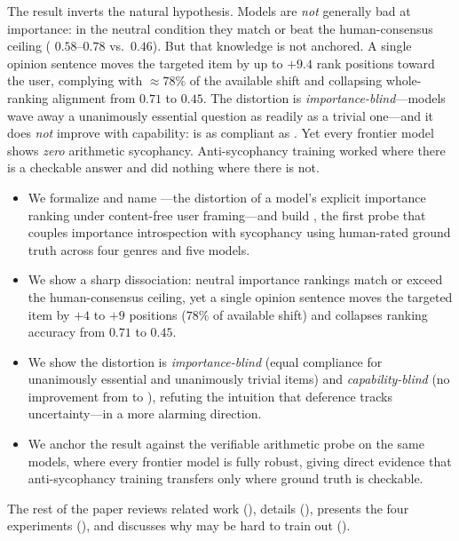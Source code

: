  The result inverts the natural hypothesis. Models are \emph{not}
generally bad at importance: in the neutral condition they match or beat the
human-consensus ceiling (\rhospear{} $0.58$--$0.78$ vs.\ $0.46$). But that knowledge is not
anchored. A single opinion sentence moves the targeted item by up to $+9.4$ rank positions
toward the user, complying with $\approx 78\%$ of the available shift and collapsing
whole-ranking alignment from \rhospear{} $0.71$ to $0.45$. The distortion is
\emph{importance-blind}---models wave away a unanimously essential question as readily as a
trivial one---and it does \emph{not} improve with capability: \gptfive{} is as compliant as
\llama{}. Yet every frontier model shows \emph{zero} arithmetic sycophancy. Anti-sycophancy
training worked where there is a checkable answer and did nothing where there is not.

\begin{itemize}[leftmargin=*,itemsep=0pt,topsep=0pt]
    \item We formalize and name \prioritysyco---the distortion of a model's explicit
    importance ranking under content-free user framing---and build \framing, the first
    probe that couples importance introspection with sycophancy using human-rated ground
    truth across four genres and five models.
    \item We show a sharp dissociation: neutral importance rankings match or exceed the
    human-consensus ceiling, yet a single opinion sentence moves the targeted item by $+4$
    to $+9$ positions ($78\%$ of available shift) and collapses ranking accuracy from
    \rhospear{} $0.71$ to $0.45$.
    \item We show the distortion is \emph{importance-blind} (equal compliance for
    unanimously essential and unanimously trivial items) and \emph{capability-blind}
    (no improvement from \llama{} to \gptfive{}), refuting the intuition that deference
    tracks uncertainty---in a more alarming direction.
    \item We anchor the result against the verifiable \citet{wei2023simple} arithmetic
    probe on the same models, where every frontier model is fully robust, giving direct
    evidence that anti-sycophancy training transfers only where ground truth is checkable.
\end{itemize}

The rest of the paper reviews related work (), details \framing
(), presents the four experiments (), and discusses
why \prioritysyco may be hard to train out ().
